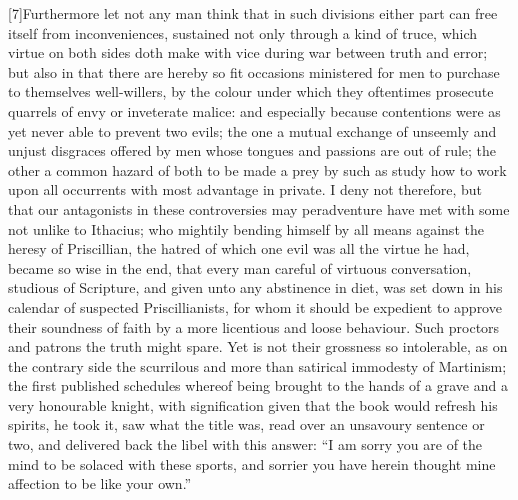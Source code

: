 [7]Furthermore let not any man think that in such divisions either part can free itself from inconveniences, sustained not only through a kind of truce, which virtue on both sides doth make with vice during war between truth and error; but also in that there are hereby so fit occasions ministered for men to purchase to themselves well-willers, by the colour under which they oftentimes prosecute quarrels of envy or inveterate malice: and especially because contentions were as yet never able to prevent two evils; the one a mutual exchange of unseemly and unjust disgraces offered by men whose tongues and passions are out of rule; the other a common hazard of both to be made a prey by such as study how to work upon all occurrents with most advantage in private. I deny not therefore, but that our antagonists in these controversies may peradventure have met with some not unlike to Ithacius; who mightily bending himself by all means against the heresy of Priscillian, the hatred of which one evil was all the virtue he had, became so wise in the end, that every man careful of virtuous conversation, studious of Scripture, and given unto any abstinence in diet, was set down in his calendar of suspected Priscillianists, for whom it should be expedient to approve their soundness of faith by a more licentious and loose behaviour. Such proctors and patrons the truth might spare. Yet is not their grossness so intolerable, as on the contrary side the scurrilous and more than satirical immodesty of Martinism; the first published schedules whereof being brought to the hands of a grave and a very honourable knight, with signification given that the book would refresh his spirits, he took it, saw what the title was, read over an unsavoury sentence or two, and delivered back the libel with this answer: “I am sorry you are of the mind to be solaced with these sports, and sorrier you have herein thought mine affection to be like your own.”

